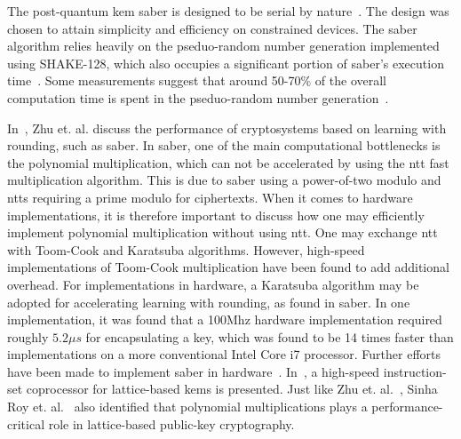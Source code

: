 The \gls{post-quantum} \gls{kem} \gls{saber} is designed to be serial by nature~\cite{sinha2019}. The design was chosen to attain simplicity and efficiency on constrained devices. The \gls{saber} algorithm relies heavily on the pseduo-random number generation implemented using SHAKE-128, which also occupies a significant portion of \gls{saber}'s execution time~\cite{sinha2019}. Some measurements suggest that around 50-70\% of the overall computation time is spent in the pseduo-random number generation~\cite{saber}.

In~\cite{zhu2021}, Zhu et. al. discuss the performance of cryptosystems based on learning with rounding, such as \gls{saber}. In \gls{saber}, one of the main computational bottlenecks is the polynomial multiplication, which can not be accelerated by using the \gls{ntt} fast multiplication algorithm. This is due to \gls{saber} using a power-of-two modulo and \glspl{ntt} requiring a prime modulo for ciphertexts. When it comes to hardware implementations, it is therefore important to discuss how one may efficiently implement polynomial multiplication without using \gls{ntt}. One may exchange \gls{ntt} with Toom-Cook and Karatsuba algorithms. However, high-speed implementations of Toom-Cook multiplication have been found to add additional overhead. For implementations in hardware, a Karatsuba algorithm may be adopted for accelerating learning with rounding, as found in \gls{saber}. In one implementation, it was found that a 100Mhz hardware implementation required roughly $5.2\mu s$ for encapsulating a key, which was found to be 14 times faster than implementations on a more conventional Intel Core i7 processor. Further efforts have been made to implement \gls{saber} in hardware~\cite{roy2020}. In~\cite{roy2020}, a high-speed instruction-set coprocessor for lattice-based \glspl{kem} is presented. Just like Zhu et. al.~\cite{zhu2021}, Sinha Roy et. al.~\cite{roy2020} also identified that polynomial multiplications plays a performance-critical role in lattice-based public-key cryptography.


